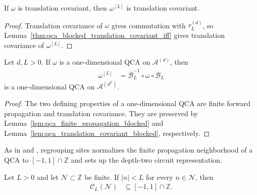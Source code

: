 \begin{lemma}
    \label{lem:qca_translation_covariant_blocked}
    \leanok
    If $\omega$ is translation covariant, then $\omega^{[L]}$ is translation
    covariant.
\end{lemma}

\begin{proof}\leanok
    Translation covariance of $\omega$ gives commutation with
    $\overline\tau^{(d)}_L$, so
    Lemma~\ref{thm:qca_blocked_translation_covariant_iff} gives translation covariance of $\omega^{[L]}$.
\end{proof}

\begin{lemma}
    \label{lem:qca_blocked}
    \leanok
    Let $d,L>0$.  If $\omega$ is a one-dimensional QCA on
    $\mathcal A^{(d)}$, then
    \begin{align}
        \omega^{[L]}
         & =\overline{\mathcal B}_L^{-1}\circ\omega\circ
        \overline{\mathcal B}_L
    \end{align}
    is a one-dimensional QCA on $\mathcal A^{(d^L)}$.
\end{lemma}

\begin{proof}\leanok
    The two defining properties of a one-dimensional QCA are finite forward
    propagation and translation covariance.  They are preserved by
    Lemma~\ref{lem:qca_finite_propagation_blocked} and
    Lemma~\ref{lem:qca_translation_covariant_blocked}, respectively.
\end{proof}

As in \cite[line~2308]{Cirac2017MPU} and \cite{SchumacherWerner2004QCA}, regrouping sites normalizes the finite propagation neighborhood of a QCA to
$[-1,1]\cap\mathbb Z$ and sets up the depth-two circuit
representation.

\begin{lemma}
    \label{lem:qca_blocked_neighborhood_subset_nearest_neighbor}
    \leanok
    Let $L>0$ and let $\mathcal N\subset\mathbb Z$ be finite.  If
    $|n|<L$ for every $n\in\mathcal N$, then
    \begin{align}
        \mathcal C_L(\mathcal N) & \subseteq[-1,1]\cap\mathbb Z.
    \end{align}
\end{lemma}

